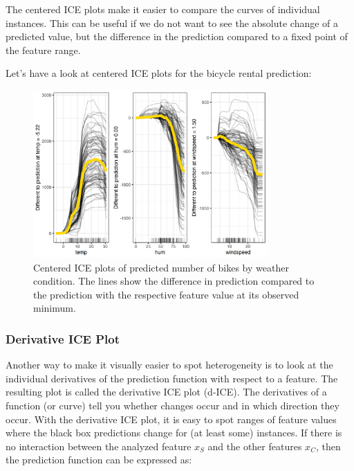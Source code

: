 \documentclass[
  10pt,
]{scrbook}
\begin{document}
The centered ICE plots make it easier to compare the curves of individual instances.
This can be useful if we do not want to see the absolute change of a predicted value, but the difference in the prediction compared to a fixed point of the feature range.

Let's have a look at centered ICE plots for the bicycle rental prediction:

\begin{figure}

{\centering \includegraphics[width=0.8\textwidth]{images/ice-bike-centered-1} 

}

\caption{Centered ICE plots of predicted number of bikes by weather condition. The lines show the difference in prediction compared to the prediction with the respective feature value at its observed minimum.}\label{fig:ice-bike-centered}
\end{figure}

\hypertarget{derivative-ice-plot}{%
\subsubsection{Derivative ICE Plot}\label{derivative-ice-plot}}

Another way to make it visually easier to spot heterogeneity is to look at the individual derivatives of the prediction function with respect to a feature.
The resulting plot is called the derivative ICE plot (d-ICE).
The derivatives of a function (or curve) tell you whether changes occur and in which direction they occur.
With the derivative ICE plot, it is easy to spot ranges of feature values where the black box predictions change for (at least some) instances.
If there is no interaction between the analyzed feature \(x_S\) and the other features \(x_C\), then the prediction function can be expressed as:
\end{document}

